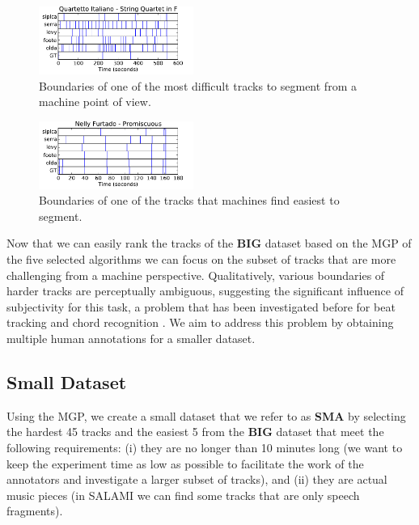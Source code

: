 \documentclass{article}
\begin{document}
\begin{figure}
  \centering
  \includegraphics[width=0.45\textwidth, height=0.13\textheight]{plots/Quartetto-machine.pdf}
  \caption{Boundaries of one of the most difficult tracks to segment from a machine point of view.}
  \label{fig:quartetto}
\end{figure}%

\begin{figure}
  \centering
  \includegraphics[width=0.45\textwidth, height=0.13\textheight]{plots/Promiscuous-machine.pdf}
  \caption{Boundaries of one of the tracks that machines find easiest to segment.}
  \label{fig:promiscuous}
\end{figure}%

Now that we can easily rank the tracks of the \textbf{BIG} dataset based on the MGP of the five selected algorithms we can focus on the subset of tracks that are more challenging from a machine perspective.
Qualitatively, various boundaries of harder tracks are perceptually ambiguous, suggesting the significant influence of subjectivity for this task, a problem that has been investigated before for beat tracking \cite{Grosche2010} and chord recognition \cite{Ni2013}.
We aim to address this problem by obtaining multiple human annotations for a smaller dataset.

\subsection{Small Dataset}

Using the MGP, we create a small dataset that we refer to as \textbf{SMA} by selecting the hardest 45 tracks and the easiest 5 from the \textbf{BIG} dataset that meet the following requirements: (i) they are no longer than 10 minutes long (we want to keep the experiment time as low as possible to facilitate the work of the annotators and investigate a larger subset of tracks), and (ii) they are actual music pieces (in SALAMI we can find some tracks that are only speech fragments).
\end{document}
